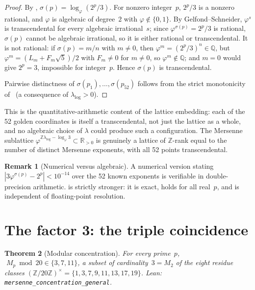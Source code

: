 \documentclass[11pt]{amsart}
\newtheorem{Theorem}{Theorem}[section]
\theoremstyle{definition}
\newtheorem{Remark}[Theorem]{Remark}
\newcommand{\golden}{\varphi}
\newcommand{\Mp}{M_{p}}
\newcommand{\Ztwenty}{(\mathbb{Z}/20\mathbb{Z})^{\times}}
\newcommand{\lean}[1]{\texttt{#1}}
\begin{document}
\begin{proof}
By , $\sigma(p)=\log_{\golden}(2^{p}/3)$.  For nonzero
integer~$p$, $2^{p}/3$ is a nonzero rational, and $\golden$ is algebraic of
degree~$2$ with $\golden\notin\{0,1\}$.  By Gelfond--Schneider,
$\golden^{s}$ is transcendental for every algebraic irrational~$s$; since
$\golden^{\sigma(p)}=2^{p}/3$ is rational, $\sigma(p)$ cannot be algebraic
irrational, so it is either rational or transcendental.  It is not
rational: if $\sigma(p)=m/n$ with $m\neq 0$, then
$\golden^{m}=(2^{p}/3)^{n}\in\mathbb{Q}$, but
$\golden^{m}=(L_{m}+F_{m}\sqrt5)/2$ with $F_{m}\neq 0$ for $m\neq 0$, so
$\golden^{m}\notin\mathbb{Q}$; and $m=0$ would give $2^{p}=3$, impossible
for integer~$p$.  Hence $\sigma(p)$ is transcendental.

Pairwise distinctness of $\sigma(p_{1}),\ldots,\sigma(p_{52})$ follows
from the strict monotonicity of~ (a consequence of
$\lambda_{\log}>0$).
\end{proof}

This is the quantitative-arithmetic content of the lattice embedding:
each of the 52 golden coordinates is itself a transcendental, not just
the lattice as a whole, and no algebraic choice of $\lambda$ could
produce such a configuration.  The Mersenne sublattice
$\golden^{\mathbb{Z}\lambda_{\log}-\log_{\golden}3}\subset\mathbb{R}_{>0}$
is genuinely a lattice of $\mathbb{Z}$-rank equal to the number of
distinct Mersenne exponents, with all 52 points transcendental.

\begin{Remark}[Numerical versus algebraic]
A numerical version stating $|3\golden^{\sigma(p)}-2^{p}|<10^{-14}$ over
the 52 known exponents is verifiable in double-precision arithmetic.
 is strictly stronger: it is exact, holds for all
real~$p$, and is independent of floating-point resolution.
\end{Remark}

\section{The factor 3: the triple coincidence}
\label{sec:triple}

\begin{Theorem}[Modular concentration]\label{thm:concentration-main}
For every prime~$p$, $\;\Mp\bmod 20 \in \{3,7,11\}$, a subset of
cardinality~$3=M_{2}$ of the eight residue classes
$\Ztwenty=\{1,3,7,9,11,13,17,19\}$.  Lean:
\lean{mersenne\_concentration\_general}.
\end{Theorem}
\end{document}

